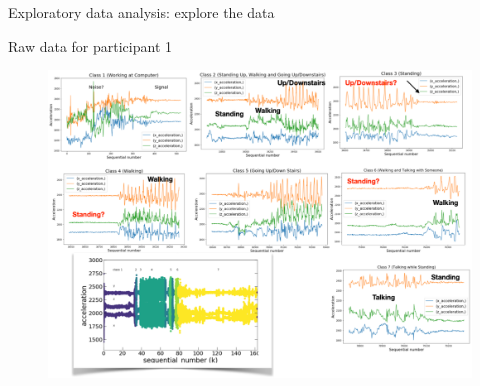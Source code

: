 \documentclass{if-beamer}
\begin{document}
\begin{frame}{Exploratory data analysis: explore the data}
        \begin{block}{Raw data for participant 1}
                     \begin{figure}
                \includegraphics[scale=0.35]{./figs/paricipant01.png}
                \end{figure} 
   	 \end{block}
	
\end{frame}
\end{document}
